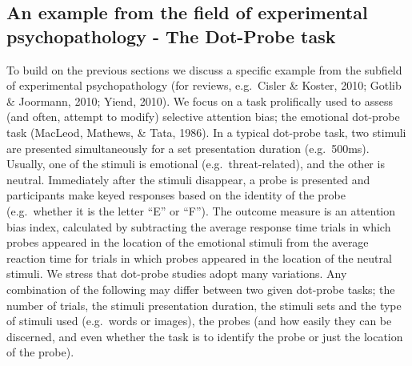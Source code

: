 \documentclass[english,,man,floatsintext]{apa6}
\begin{document}
\hypertarget{an-example-from-the-field-of-experimental-psychopathology---the-dot-probe-task}{%
\subsection{An example from the field of experimental psychopathology - The Dot-Probe task}\label{an-example-from-the-field-of-experimental-psychopathology---the-dot-probe-task}}

To build on the previous sections we discuss a specific example from the subfield of experimental psychopathology (for reviews, e.g.~Cisler \& Koster, 2010; Gotlib \& Joormann, 2010; Yiend, 2010). We focus on a task prolifically used to assess (and often, attempt to modify) selective attention bias; the emotional dot-probe task (MacLeod, Mathews, \& Tata, 1986). In a typical dot-probe task, two stimuli are presented simultaneously for a set presentation duration (e.g.~500ms). Usually, one of the stimuli is emotional (e.g.~threat-related), and the other is neutral. Immediately after the stimuli disappear, a probe is presented and participants make keyed responses based on the identity of the probe (e.g.~whether it is the letter \enquote{E} or \enquote{F}). The outcome measure is an attention bias index, calculated by subtracting the average response time trials in which probes appeared in the location of the emotional stimuli from the average reaction time for trials in which probes appeared in the location of the neutral stimuli. We stress that dot-probe studies adopt many variations. Any combination of the following may differ between two given dot-probe tasks; the number of trials, the stimuli presentation duration, the stimuli sets and the type of stimuli used (e.g.~words or images), the probes (and how easily they can be discerned, and even whether the task is to identify the probe or just the location of the probe).
\end{document}
